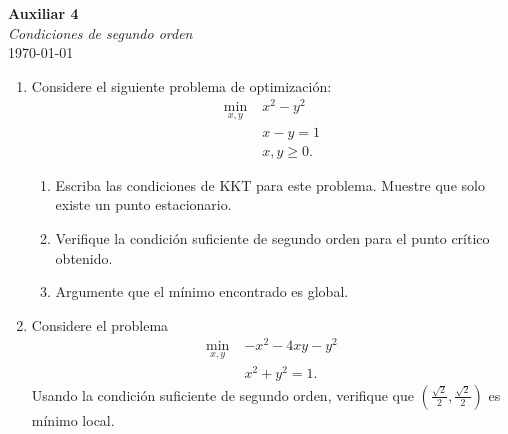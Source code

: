 \documentclass{article}
\begin{document}


\begin{center}
    \Huge{\textbf{Auxiliar 4}}\\
\textit{\large{Condiciones de segundo orden}}\\
    \normalsize
    \today
\end{center}

\begin{enumerate}
	\item Considere el siguiente problema de optimización:
		\begin{align*}
			\min_{x, y} \; & x^2 - y^2 \\
				       & x - y = 1 \\
				       & x, y \geq 0.
		\end{align*}
		\begin{enumerate}
			\item Escriba las condiciones de KKT para este problema. Muestre que solo existe un punto estacionario.
			\item Verifique la condición suficiente de segundo orden para el punto crítico obtenido.
			\item Argumente que el mínimo encontrado es global.
		\end{enumerate}
	\item Considere el problema
		\begin{align*}
			\min_{x, y} \; & -x^2 - 4xy - y^2 \\
					   & x^2 + y^2 = 1.
		\end{align*}
		Usando la condición suficiente de segundo orden, verifique que \(\left(\frac{\sqrt{2}}{2}, \frac{\sqrt{2}}{2}\right)\) es mínimo local.
\end{enumerate}
\end{document}
